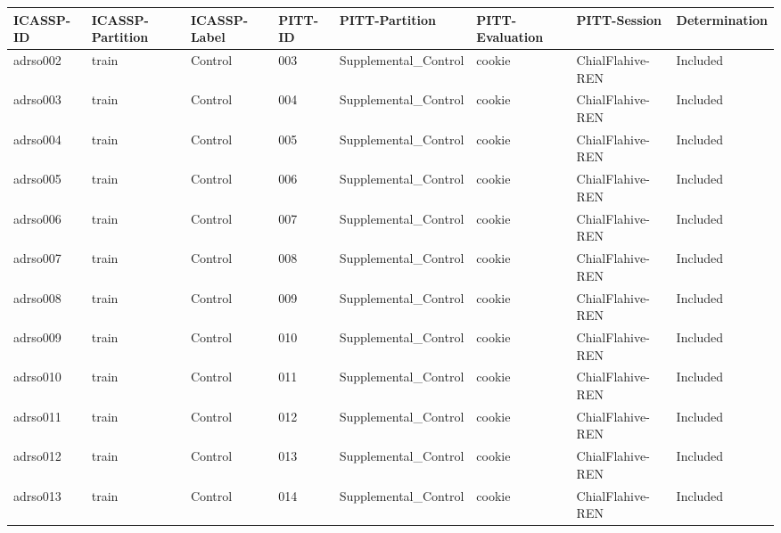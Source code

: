 \begin{center}
\tiny
\begin{longtable}{|l|l|l|l|l|l|l|l|}
\hline
ICASSP-ID & ICASSP-Partition & ICASSP-Label & PITT-ID     & PITT-Partition       & PITT-Evaluation & PITT-Session     & Determination \\ \hline
adrso002  & train            & Control      & 003         & Supplemental\_Control & cookie          & ChialFlahive-REN & Included      \\ \hline
adrso003  & train            & Control      & 004         & Supplemental\_Control & cookie          & ChialFlahive-REN & Included      \\ \hline
adrso004  & train            & Control      & 005         & Supplemental\_Control & cookie          & ChialFlahive-REN & Included      \\ \hline
adrso005  & train            & Control      & 006         & Supplemental\_Control & cookie          & ChialFlahive-REN & Included      \\ \hline
adrso006  & train            & Control      & 007         & Supplemental\_Control & cookie          & ChialFlahive-REN & Included      \\ \hline
adrso007  & train            & Control      & 008         & Supplemental\_Control & cookie          & ChialFlahive-REN & Included      \\ \hline
adrso008  & train            & Control      & 009         & Supplemental\_Control & cookie          & ChialFlahive-REN & Included      \\ \hline
adrso009  & train            & Control      & 010         & Supplemental\_Control & cookie          & ChialFlahive-REN & Included      \\ \hline
adrso010  & train            & Control      & 011         & Supplemental\_Control & cookie          & ChialFlahive-REN & Included      \\ \hline
adrso011  & train            & Control      & 012         & Supplemental\_Control & cookie          & ChialFlahive-REN & Included      \\ \hline
adrso012  & train            & Control      & 013         & Supplemental\_Control & cookie          & ChialFlahive-REN & Included      \\ \hline
adrso013  & train            & Control      & 014         & Supplemental\_Control & cookie          & ChialFlahive-REN & Included      \\ \hline

\end{longtable}
\end{center}

